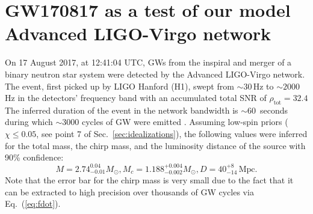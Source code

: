 \documentclass[amsmath,amssymb,aps,floats,amsfonts,notitlepage,superscriptaddress,eqsecnum,nofootinbib,10pt]{revtex4-1}
\newcommand{\be}{\begin{equation}}
\newcommand{\ee}{\end{equation}}
\begin{document}
\begin{enumerate}
%
\end{enumerate}
%
%

\section{GW170817 as a test of our model Advanced LIGO-Virgo network}\label{Sec:GW170817}
On 17 August 2017, at 12:41:04 UTC, GWs from the inspiral and merger of a binary neutron star system were detected by the Advanced LIGO-Virgo network.
The event, first picked up by LIGO Hanford (H1), swept from $\sim 30\,$Hz to $\sim 2000\,$Hz in the detectors' frequency band with an accumulated total SNR of
$\rho_\text{tot} = 32.4$ \cite{GW170817}
The inferred duration of the event in the network bandwidth is $\sim 60\,$ seconds during which $\sim 3000$ cycles of GW were emitted \cite{GW170817_Facts}.
Assuming low-spin priors  ($\chi \le 0.05$, see point 7 of Sec.~\ref{sec:idealizations}), the following values were inferred for the total mass, the chirp mass,
and the luminosity distance of the source with 90\% confidence:
%
\be
M = 2.74^{0.04}_{-0.01} M_\odot, M_c = 1.188^{+0.004}_{-0.002} M_\odot, D= 40^{+8}_{-14}\,\text{Mpc}. \label{eq:GW170817_params}
\ee
%
Note that the error bar for the chirp mass is very small
due to the fact that it can be extracted to high precision over thousands of GW cycles via Eq.~(\ref{eq:fdot}).
\end{document}
